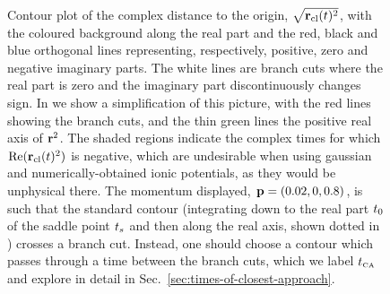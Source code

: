 \begin{figure}[t!]
  \centering
  \captionsetup[figure]{position=b}
  \captionsetup[subfigure]{position=b}
  \\[-3mm]
  \captionsetup{width=\textwidth}
  \caption[
  Riemann surface of $\sqrt{\rcl(t)^2}$ over the complex time plane, showing branch cuts that cross the standard integration path along the real axis
  ]{
  \protect{} Contour plot of the complex distance to the origin, $\sqrt{\rcl(t)^2}$, with the coloured background along the real part and the red, black and blue orthogonal lines representing, respectively, positive, zero and negative imaginary parts. The white lines are branch cuts where the real part is zero and the imaginary part discontinuously changes sign.
  In \protect{} we show a simplification of this picture, with the red lines showing the branch cuts, and the thin green lines the positive real axis of $\vb{r}^2$. The shaded regions indicate the complex times for which $\Re(\vb{r}_{\mathrm{cl}}(t)^2)$ is negative, which are undesirable when using gaussian and numerically-obtained ionic potentials, as they would be unphysical there.
  The momentum displayed, $\vb{p}=(0.02,0,0.8)$, is such that the standard contour (integrating down to the real part ${t_0}$ of the saddle point ${t_s}$ and then along the real axis, shown dotted in \protect{}) crosses a branch cut. Instead, one should choose a contour which passes through a time between the branch cuts, which we label ${t_{\scriptscriptstyle\mathrm{CA}}}$ and explore in detail in Sec.~\ref{sec:times-of-closest-approach}.
  }
  \label{f5-complex-position-branch-cuts}
\end{figure}


